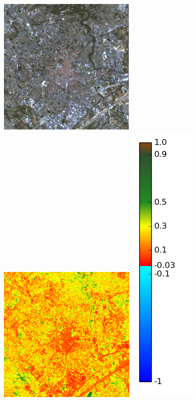\documentclass{book}
\begin{document}
\begin{figure}[H]
{}
\centerline{
\includegraphics[scale=0.6]{images/Montpellier/07_rgb.png}
\includegraphics[scale=0.6]{images/Montpellier/07_ndvi.png}
\includegraphics[scale=0.3]{images/colormap.png}
}
\end{figure}
\end{document}
